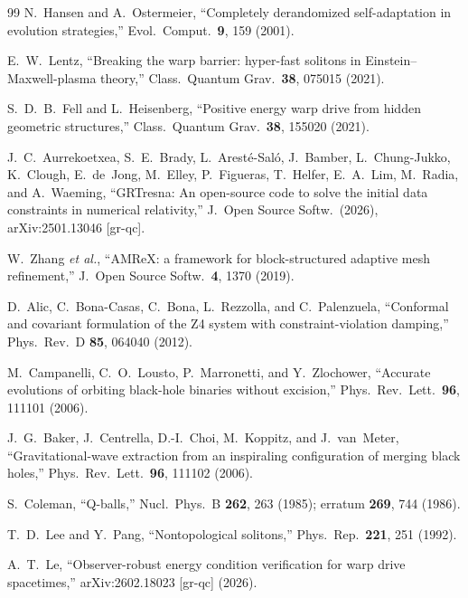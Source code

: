 \documentclass[twocolumn,floatfix,aps,prd,nofootinbib]{revtex4-2}
\begin{document}
\begin{thebibliography}{99}
N.~Hansen and A.~Ostermeier,
\newblock ``Completely derandomized self-adaptation in evolution strategies,''
\newblock Evol.\ Comput.\ \textbf{9}, 159 (2001).

E.~W.~Lentz,
\newblock ``Breaking the warp barrier: hyper-fast solitons in
Einstein--Maxwell-plasma theory,''
\newblock Class.\ Quantum Grav.\ \textbf{38}, 075015 (2021).

S.~D.~B.~Fell and L.~Heisenberg,
\newblock ``Positive energy warp drive from hidden geometric structures,''
\newblock Class.\ Quantum Grav.\ \textbf{38}, 155020 (2021).

J.~C.~Aurrekoetxea, S.~E.~Brady, L.~Arest\'e-Sal\'o, J.~Bamber,
L.~Chung-Jukko, K.~Clough, E.~de~Jong, M.~Elley, P.~Figueras, T.~Helfer,
E.~A.~Lim, M.~Radia, and A.~Waeming,
\newblock ``GRTresna: An open-source code to solve the initial data
constraints in numerical relativity,''
\newblock J.\ Open Source Softw.\ (2026), arXiv:2501.13046 [gr-qc].

W.~Zhang \textit{et al.},
\newblock ``AMReX: a framework for block-structured adaptive mesh
refinement,''
\newblock J.\ Open Source Softw.\ \textbf{4}, 1370 (2019).

D.~Alic, C.~Bona-Casas, C.~Bona, L.~Rezzolla, and C.~Palenzuela,
\newblock ``Conformal and covariant formulation of the Z4 system with
constraint-violation damping,''
\newblock Phys.\ Rev.\ D \textbf{85}, 064040 (2012).

M.~Campanelli, C.~O.~Lousto, P.~Marronetti, and Y.~Zlochower,
\newblock ``Accurate evolutions of orbiting black-hole binaries without
excision,''
\newblock Phys.\ Rev.\ Lett.\ \textbf{96}, 111101 (2006).

J.~G.~Baker, J.~Centrella, D.-I.~Choi, M.~Koppitz, and J.~van~Meter,
\newblock ``Gravitational-wave extraction from an inspiraling configuration
of merging black holes,''
\newblock Phys.\ Rev.\ Lett.\ \textbf{96}, 111102 (2006).

S.~Coleman,
\newblock ``Q-balls,''
\newblock Nucl.\ Phys.\ B \textbf{262}, 263 (1985);
erratum \textbf{269}, 744 (1986).

T.~D.~Lee and Y.~Pang,
\newblock ``Nontopological solitons,''
\newblock Phys.\ Rep.\ \textbf{221}, 251 (1992).

A.~T.~Le,
\newblock ``Observer-robust energy condition verification for warp drive spacetimes,''
\newblock arXiv:2602.18023 [gr-qc] (2026).


\end{thebibliography}
\end{document}
